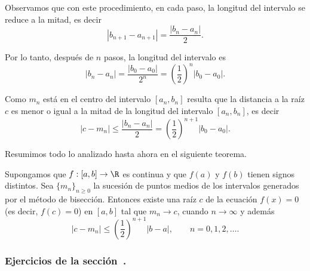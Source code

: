 Observamos que con este procedimiento, en cada paso, la longitud del intervalo se reduce a la mitad, es decir
\[
|b_{n+1} - a_{n+1}| = \frac{|b_n-a_n|}2.
\]

Por lo tanto, después de $n$ pasos, la longitud del intervalo es
\[
|b_n - a_n| = \frac{|b_0-a_0|}{2^n} = \left(\frac12\right)^n |b_0-a_0|.
\]

Como $m_n$ está en el centro del intervalo $[a_n,b_n]$ resulta que la distancia a la raíz $c$ es menor o igual a la mitad de la longitud del intervalo $[a_n,b_n]$, es decir
\[
|c - m_n| \le \frac{|b_n-a_n|}2 = \left(\frac12\right)^{n+1} |b_0-a_0|.
\]

Resumimos todo lo analizado hasta ahora en el siguiente teorema.

\begin{theorem}
Supongamos que $f:[a,b] \to \R$ es continua y que $f(a)$ y $f(b)$ tienen signos distintos.
Sea $\{ m_n \}_{n\ge 0}$ la sucesión de puntos medios de los intervalos generados por el método de bisección. Entonces existe una raíz $c$ de la ecuación $f(x)=  0$ (es decir, $f(c)=0$) en $[a,b]$ tal que $m_n \to c$, cuando $n\to\infty$ y además
\[
|c - m_n | \le \left(\frac12\right)^{n+1} |b-a|, \qquad n=0,1,2,\dots.
\]
\end{theorem}

\subsubsection*{Ejercicios de la sección~.}

\begin{enumerate}

\end{enumerate}

